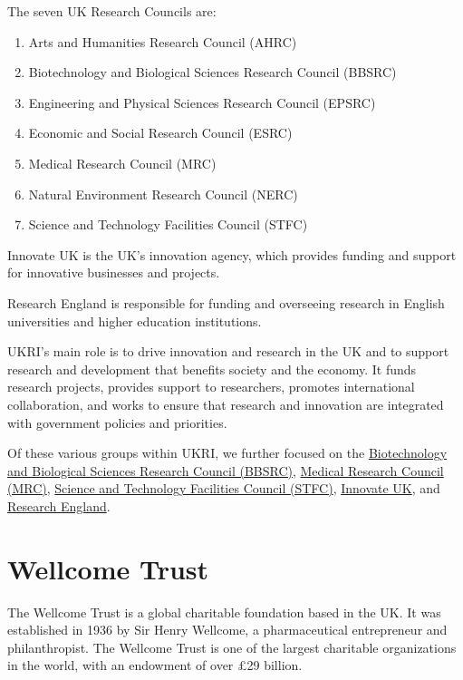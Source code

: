 \documentclass[
]{book}
\providecommand{\tightlist}{%
  \setlength{\itemsep}{0pt}\setlength{\parskip}{0pt}}
\begin{document}
The seven UK Research Councils are:

\begin{enumerate}
\def\labelenumi{\arabic{enumi}.}
\tightlist
\item
  Arts and Humanities Research Council (AHRC)
\item
  Biotechnology and Biological Sciences Research Council (BBSRC)
\item
  Engineering and Physical Sciences Research Council (EPSRC)
\item
  Economic and Social Research Council (ESRC)
\item
  Medical Research Council (MRC)
\item
  Natural Environment Research Council (NERC)
\item
  Science and Technology Facilities Council (STFC)
\end{enumerate}

Innovate UK is the UK's innovation agency, which provides funding and support for innovative businesses and projects.

Research England is responsible for funding and overseeing research in English universities and higher education institutions.

UKRI's main role is to drive innovation and research in the UK and to support research and development that benefits society and the economy. It funds research projects, provides support to researchers, promotes international collaboration, and works to ensure that research and innovation are integrated with government policies and priorities.

Of these various groups within UKRI, we further focused on the \href{https://www.ukri.org/councils/bbsrc/}{Biotechnology and Biological Sciences Research Council (BBSRC)}, \href{https://www.ukri.org/councils/mrc/}{Medical Research Council (MRC)}, \href{https://www.ukri.org/councils/stfc/}{Science and Technology Facilities Council (STFC)}, \href{https://www.ukri.org/councils/innovate-uk/}{Innovate UK}, and \href{https://www.ukri.org/councils/research-england/}{Research England}.

\hypertarget{wellcome}{%
\section{Wellcome Trust}\label{wellcome}}

The Wellcome Trust is a global charitable foundation based in the UK. It was established in 1936 by Sir Henry Wellcome, a pharmaceutical entrepreneur and philanthropist. The Wellcome Trust is one of the largest charitable organizations in the world, with an endowment of over £29 billion.
\end{document}
